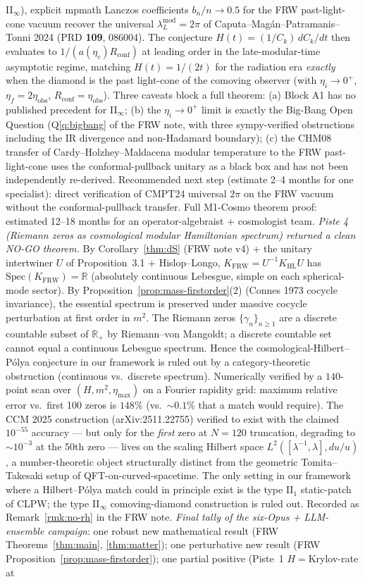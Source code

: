 \documentclass[reprint,amsmath,amssymb,aps,prd,superscriptaddress]{revtex4-2}
\providecommand{\HL}{\mathrm{HL}}
\providecommand{\FRW}{\mathrm{FRW}}
\providecommand{\R}{\mathbb{R}}
\providecommand{\1}{\mathbf{1}}
\begin{document}
II$_\infty$), explicit mpmath Lanczos coefficients $b_n/n\to 0.5$ for the FRW past-light-cone vacuum recover the universal $\lambda^{\mathrm{mod}}_L = 2\pi$ of Caputa--Mag\'an--Patramanis--Tonni 2024 (PRD \textbf{109}, 086004). The conjecture $H(t) = (1/C_k)\,dC_k/dt$ then evaluates to $1/(a(\eta_c) R_{\mathrm{conf}})$ at leading order in the late-modular-time asymptotic regime, matching $H(t)=1/(2t)$ for the radiation era \emph{exactly} when the diamond is the past light-cone of the comoving observer (with $\eta_i\to 0^+$, $\eta_f=2\eta_{\mathrm{obs}}$, $R_{\mathrm{conf}}=\eta_{\mathrm{obs}}$). Three caveats block a full theorem: (a) Block A1 has no published precedent for II$_\infty$; (b) the $\eta_i\to 0^+$ limit is exactly the Big-Bang Open Question (Q\ref{q:bigbang} of the FRW note, with three sympy-verified obstructions including the IR divergence and non-Hadamard boundary); (c) the CHM08 transfer of Cardy--Holzhey--Maldacena modular temperature to the FRW past-light-cone uses the conformal-pullback unitary as a black box and has not been independently re-derived. Recommended next step (estimate 2--4 months for one specialist): direct verification of CMPT24 universal $2\pi$ on the FRW vacuum without the conformal-pullback transfer. Full M1-Cosmo theorem proof: estimated 12--18 months for an operator-algebraist + cosmologist team. \emph{Piste 4 (Riemann zeros as cosmological modular Hamiltonian spectrum) returned a clean NO-GO theorem.} By Corollary~\ref{thm:dS} (FRW note v4) + the unitary intertwiner $U$ of Proposition~3.1 + Hislop--Longo, $K_{\FRW} = U^{-1} K_\HL U$ has $\mathrm{Spec}(K_{\FRW})=\R$ (absolutely continuous Lebesgue, simple on each spherical-mode sector). By Proposition~\ref{prop:mass-firstorder}(2) (Connes 1973 cocycle invariance), the essential spectrum is preserved under massive cocycle perturbation at first order in $m^2$. The Riemann zeros $\{\gamma_n\}_{n\ge 1}$ are a discrete countable subset of $\R_+$ by Riemann--von Mangoldt; a discrete countable set cannot equal a continuous Lebesgue spectrum. Hence the cosmological-Hilbert--P\'olya conjecture in our framework is ruled out by a category-theoretic obstruction (continuous vs.\ discrete spectrum). Numerically verified by a $140$-point scan over $(H, m^2, \eta_{\max})$ on a Fourier rapidity grid: maximum relative error vs.\ first 100 zeros is $148\%$ (vs.\ $\sim 0.1\%$ that a match would require). The CCM 2025 construction (arXiv:2511.22755) verified to exist with the claimed $10^{-55}$ accuracy --- but only for the \emph{first} zero at $N=120$ truncation, degrading to $\sim 10^{-3}$ at the 50th zero --- lives on the scaling Hilbert space $L^2([\lambda^{-1},\lambda], du/u)$, a number-theoretic object structurally distinct from the geometric Tomita--Takesaki setup of QFT-on-curved-spacetime. The only setting in our framework where a Hilbert--P\'olya match could in principle exist is the type II$_1$ static-patch of CLPW; the type II$_\infty$ comoving-diamond construction is ruled out. Recorded as Remark~\ref{rmk:no-rh} in the FRW note. \emph{Final tally of the six-Opus + LLM-ensemble campaign}: one robust new mathematical result (FRW Theorems~\ref{thm:main}, \ref{thm:matter}); one perturbative new result (FRW Proposition~\ref{prop:mass-firstorder}); one partial positive (Piste~1 $H=$Krylov-rate at 
\end{document}
